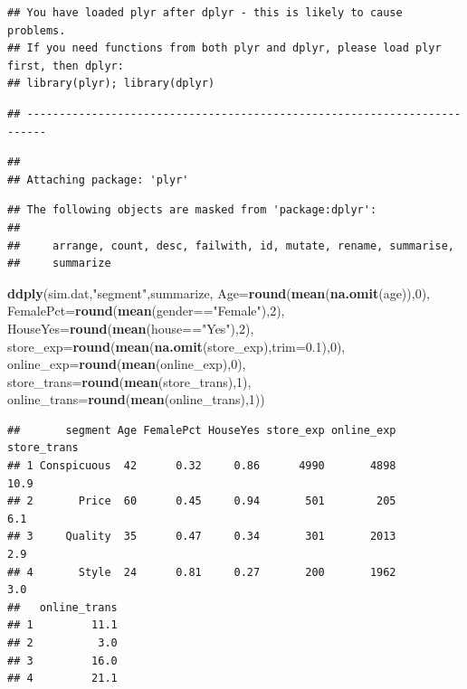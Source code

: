 \documentclass[]{book}
\newenvironment{Shaded}{\begin{snugshade}}{\end{snugshade}}
\newcommand{\KeywordTok}[1]{\textcolor[rgb]{0.13,0.29,0.53}{\textbf{{#1}}}}
\newcommand{\DataTypeTok}[1]{\textcolor[rgb]{0.13,0.29,0.53}{{#1}}}
\newcommand{\DecValTok}[1]{\textcolor[rgb]{0.00,0.00,0.81}{{#1}}}
\newcommand{\FloatTok}[1]{\textcolor[rgb]{0.00,0.00,0.81}{{#1}}}
\newcommand{\StringTok}[1]{\textcolor[rgb]{0.31,0.60,0.02}{{#1}}}
\newcommand{\NormalTok}[1]{{#1}}
\theoremstyle{definition}
\theoremstyle{definition}
\theoremstyle{remark}
\begin{document}
\begin{verbatim}
## You have loaded plyr after dplyr - this is likely to cause problems.
## If you need functions from both plyr and dplyr, please load plyr first, then dplyr:
## library(plyr); library(dplyr)
\end{verbatim}

\begin{verbatim}
## -------------------------------------------------------------------------
\end{verbatim}

\begin{verbatim}
## 
## Attaching package: 'plyr'
\end{verbatim}

\begin{verbatim}
## The following objects are masked from 'package:dplyr':
## 
##     arrange, count, desc, failwith, id, mutate, rename, summarise,
##     summarize
\end{verbatim}

\begin{Shaded}
\begin{Highlighting}[]
\KeywordTok{ddply}\NormalTok{(sim.dat,}\StringTok{"segment"}\NormalTok{,summarize, }\DataTypeTok{Age=}\KeywordTok{round}\NormalTok{(}\KeywordTok{mean}\NormalTok{(}\KeywordTok{na.omit}\NormalTok{(age)),}\DecValTok{0}\NormalTok{),}
      \DataTypeTok{FemalePct=}\KeywordTok{round}\NormalTok{(}\KeywordTok{mean}\NormalTok{(gender==}\StringTok{"Female"}\NormalTok{),}\DecValTok{2}\NormalTok{),}
      \DataTypeTok{HouseYes=}\KeywordTok{round}\NormalTok{(}\KeywordTok{mean}\NormalTok{(house==}\StringTok{"Yes"}\NormalTok{),}\DecValTok{2}\NormalTok{),}
      \DataTypeTok{store_exp=}\KeywordTok{round}\NormalTok{(}\KeywordTok{mean}\NormalTok{(}\KeywordTok{na.omit}\NormalTok{(store_exp),}\DataTypeTok{trim=}\FloatTok{0.1}\NormalTok{),}\DecValTok{0}\NormalTok{),}
      \DataTypeTok{online_exp=}\KeywordTok{round}\NormalTok{(}\KeywordTok{mean}\NormalTok{(online_exp),}\DecValTok{0}\NormalTok{),}
      \DataTypeTok{store_trans=}\KeywordTok{round}\NormalTok{(}\KeywordTok{mean}\NormalTok{(store_trans),}\DecValTok{1}\NormalTok{),}
      \DataTypeTok{online_trans=}\KeywordTok{round}\NormalTok{(}\KeywordTok{mean}\NormalTok{(online_trans),}\DecValTok{1}\NormalTok{))}
\end{Highlighting}
\end{Shaded}

\begin{verbatim}
##       segment Age FemalePct HouseYes store_exp online_exp store_trans
## 1 Conspicuous  42      0.32     0.86      4990       4898        10.9
## 2       Price  60      0.45     0.94       501        205         6.1
## 3     Quality  35      0.47     0.34       301       2013         2.9
## 4       Style  24      0.81     0.27       200       1962         3.0
##   online_trans
## 1         11.1
## 2          3.0
## 3         16.0
## 4         21.1
\end{verbatim}
\end{document}

